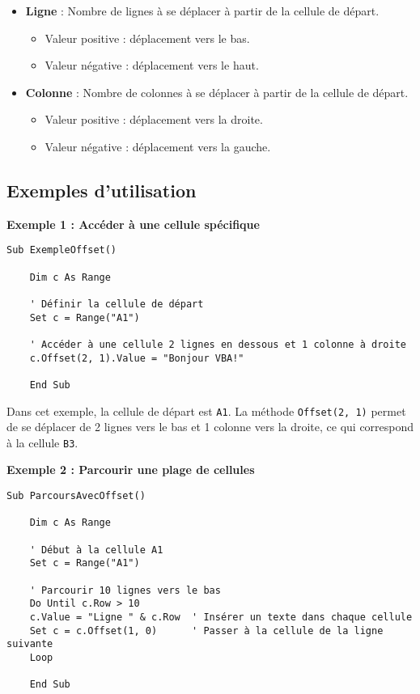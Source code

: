 \documentclass[a4paper,12pt]{report}
\begin{document}
\begin{itemize}
	\item \textbf{Ligne} : Nombre de lignes à se déplacer à partir de la cellule de départ.
	\begin{itemize}
		\item Valeur positive : déplacement vers le bas.
		\item Valeur négative : déplacement vers le haut.
	\end{itemize}
	\item \textbf{Colonne} : Nombre de colonnes à se déplacer à partir de la cellule de départ.
	\begin{itemize}
		\item Valeur positive : déplacement vers la droite.
		\item Valeur négative : déplacement vers la gauche.
	\end{itemize}
\end{itemize}
\newpage
\subsection*{Exemples d'utilisation}
\textbf{Exemple 1 : Accéder à une cellule spécifique}
\begin{lstlisting}[language=vbscript, caption={Accès à une cellule spécifique}]
	Sub ExempleOffset()
	
	Dim c As Range
	
	' Définir la cellule de départ
	Set c = Range("A1")
	
	' Accéder à une cellule 2 lignes en dessous et 1 colonne à droite
	c.Offset(2, 1).Value = "Bonjour VBA!"
	
	End Sub
\end{lstlisting}

Dans cet exemple, la cellule de départ est \texttt{A1}. La méthode \texttt{Offset(2, 1)} permet de se déplacer de 2 lignes vers le bas et 1 colonne vers la droite, ce qui correspond à la cellule \texttt{B3}.

\textbf{Exemple 2 : Parcourir une plage de cellules}
\begin{lstlisting}[language=vbscript, caption={Parcourir une plage avec \texttt{Offset}}]
	Sub ParcoursAvecOffset()
	
	Dim c As Range
	
	' Début à la cellule A1
	Set c = Range("A1")
	
	' Parcourir 10 lignes vers le bas
	Do Until c.Row > 10
	c.Value = "Ligne " & c.Row  ' Insérer un texte dans chaque cellule
	Set c = c.Offset(1, 0)      ' Passer à la cellule de la ligne suivante
	Loop
	
	End Sub
\end{lstlisting}
\end{document}
